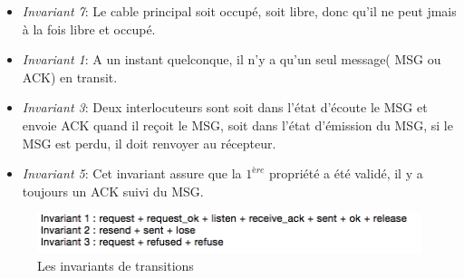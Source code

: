 \documentclass[a4paper,11pt]{report}
\begin{document}
		\begin{itemize}
		\item \textit{Invariant 7}: Le cable principal soit occupé, soit libre, donc qu'il ne peut jmais à la fois libre et occupé.
		\item \textit{Invariant 1}: A un instant quelconque, il n'y a qu'un seul message( MSG ou ACK) en transit.
		\item \textit{Invariant 3}: Deux interlocuteurs sont soit dans l'état d'écoute le MSG et envoie ACK quand il reçoit le MSG, soit dans l'état d'émission du MSG, si le MSG est perdu, il doit renvoyer au récepteur.
		\item \textit{Invariant 5}: Cet invariant assure que la $1^{ère}$ propriété a été validé, il y a toujours un ACK suivi du MSG.
	\end{itemize}
	
	\begin{figure}[!htbp]
		\centering
		\includegraphics[width = 15cm]{transition_invariant.png}
		\caption{Les invariants de transitions}
	\end{figure}
	
\end{document}

